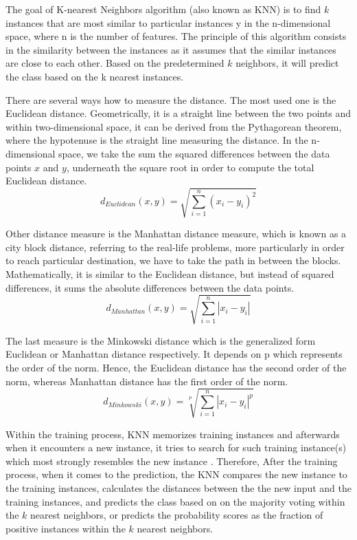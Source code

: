 The goal of K-nearest Neighbors algorithm (also known as KNN) is to find $k$ instances that are most similar to particular instances y in the n-dimensional space, where n is the number of features.
The principle of this algorithm consists in the similarity between the instances as it assumes that the similar instances are close to each other.
Based on the predetermined $k$ neighbors, it will predict the class based on the k nearest instances.


There are several ways how to measure the distance. The most used one is the Euclidean distance. Geometrically, it is a straight line between the two points  and within two-dimensional space, it can be derived from the Pythagorean theorem, where the hypotenuse is the straight line measuring the distance. In the n-dimensional space, we take the sum the squared differences between the data points $x$ and $y$, underneath the square root in order to compute the total Euclidean distance.
\begin{equation}\label{eq}
d_{Euclidean}(x,y) = \sqrt{\sum\limits_{i=1}^{n} (x_i - y_i)^2}
\end{equation}

Other distance measure is the Manhattan distance measure, which is known as a city block distance, referring to the real-life problems, more particularly in order to reach particular destination, we have to take the path in between the blocks.
Mathematically, it is similar to the Euclidean distance, but instead of squared differences, it sums the absolute differences between the data points.
\begin{equation}\label{eq}
d_{Manhattan}(x,y) = \sqrt{\sum\limits_{i=1}^{n} |x_i - y_i|}
\end{equation}

The last measure is the Minkowski distance which is the generalized form Euclidean or Manhattan distance respectively.
It depends on p which represents the order of the norm. Hence, the Euclidean distance has the second order of the norm, whereas Manhattan distance has the first order of the norm.
\begin{equation}\label{eq}
d_{Minkowski}(x,y) = \sqrt[p]{\sum\limits_{i=1}^{n} |x_i - y_i|^p}
\end{equation}

Within the training process, KNN memorizes training instances and afterwards when it encounters a new instance, it tries to search for such training instance(s) which most strongly resembles the new instance \citep{witten2011data}.
Therefore, After the training process, when it comes to the prediction, the KNN compares the new instance to the training instances, calculates the distances between the the new input and the training instances, and predicts the class based on on the majority voting within the $k$ nearest neighbors, or predicts the probability scores as the fraction of positive instances within the $k$ nearest neighbors.


